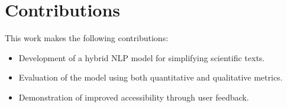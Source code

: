 \documentclass{article}
\begin{document}
\section{Contributions}
This work makes the following contributions:
\begin{itemize}
    \item Development of a hybrid NLP model for simplifying scientific texts.
    \item Evaluation of the model using both quantitative and qualitative metrics.
    \item Demonstration of improved accessibility through user feedback.
\end{itemize}



\end{document}
